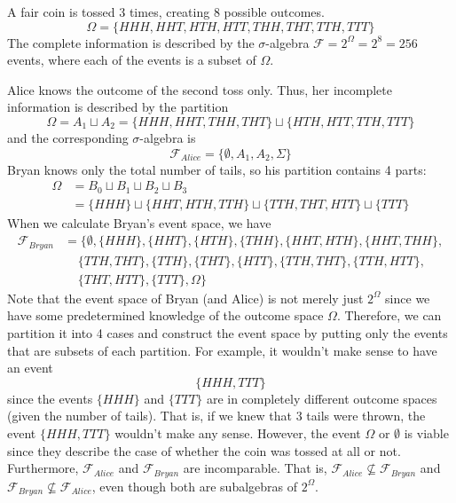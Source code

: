     \begin{example}
      A fair coin is tossed 3 times, creating 8 possible outcomes. 
      \begin{equation}
        \Omega = \{HHH, HHT, HTH, HTT, THH, THT, TTH, TTT\}
      \end{equation}
      The complete information is described by the $\sigma$-algebra $\mathcal{F} = 2^{\Omega} = 2^8 = 256$ events, where each of the events is a subset of $\Omega$. 

      Alice knows the outcome of the second toss only. Thus, her incomplete information is described by the partition 
      \begin{equation}
        \Omega = A_1 \sqcup A_2 = \{HHH, HHT, THH, THT\} \sqcup \{HTH, HTT, TTH, TTT\}
      \end{equation}
      and the corresponding $\sigma$-algebra is 
      \begin{equation}
      \mathcal{F}_{Alice} = \{\emptyset, A_1, A_2, \Sigma\}
      \end{equation}
      Bryan knows only the total number of tails, so his partition contains 4 parts: 
      \begin{align*}
        \Omega & = B_0 \sqcup B_1 \sqcup B_2 \sqcup B_3 \\
          & = \{HHH\} \sqcup \{HHT, HTH, TTH\} \sqcup \{TTH, THT, HTT\} \sqcup \{TTT\}
      \end{align*}
      When we calculate Bryan's event space, we have
      \begin{align*}
        \mathcal{F}_{Bryan} & = \big\{\emptyset, \{HHH\}, \{HHT\}, \{HTH\}, \{THH\}, \{HHT, HTH\}, \{HHT, THH\}, \\
        & \;\;\;\;\{TTH, THT\}, \{TTH\}, \{THT\}, \{HTT\}, \{TTH, THT\},\{TTH, HTT\}, \\
        & \;\;\;\;\{THT, HTT\}, \{TTT\}, \Omega \big\} 
      \end{align*}
      Note that the event space of Bryan (and Alice) is not merely just $2^{\Omega}$ since we have some predetermined knowledge of the outcome space $\Omega$. Therefore, we can partition it into 4 cases and construct the event space by putting only the events that are subsets of each partition. For example, it wouldn't make sense to have an event 
      \begin{equation}
        \{HHH, TTT\}
      \end{equation}
      since the events $\{HHH\}$ and $\{TTT\}$ are in completely different outcome spaces (given the number of tails). That is, if we knew that 3 tails were thrown, the event $\{HHH, TTT\}$ wouldn't make any sense. However, the event $\Omega$ or $\emptyset$ is viable since they describe the case of whether the coin was tossed at all or not. 
      Furthermore, $\mathcal{F}_{Alice}$ and $\mathcal{F}_{Bryan}$ are incomparable. That is, $\mathcal{F}_{Alice} \not\subseteq \mathcal{F}_{Bryan}$ and $\mathcal{F}_{Bryan} \not\subseteq \mathcal{F}_{Alice}$, even though both are subalgebras of $2^{\Omega}$. 
    \end{example}


